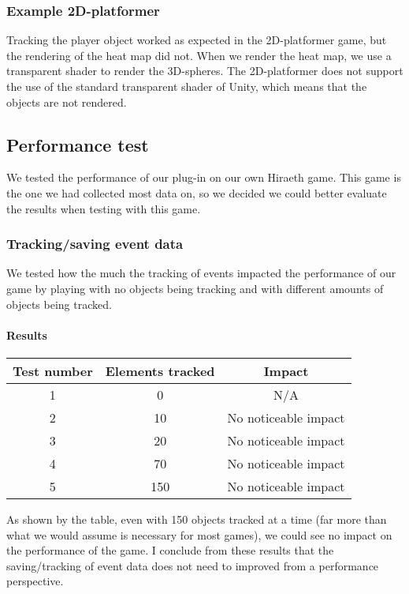 
\subsubsection{Example 2D-platformer}
\label{Test_TG_2D}
Tracking the player object worked as expected in the 2D-platformer game, but the rendering of the heat map did not. When we render the heat map, we use a transparent shader to render the 3D-spheres. The 2D-platformer does not support the use of the standard transparent shader of Unity, which means that the objects are not rendered.

\subsection{Performance test}
\label{Test_P}
We tested the performance of our plug-in on our own Hiraeth game. This game is the one we had collected most data on, so we decided we could better evaluate the results when testing with this game.

\subsubsection{Tracking/saving event data}
\label{Test_P_Saving}
We tested how the much the tracking of events impacted the performance of our game by playing with no objects being tracking and with different amounts of objects being tracked.

\paragraph{Results}
\begin{center}
\begin{tabular}{| c | c | c |}
\hline
Test number & Elements tracked & Impact \\ 
\hline
1 & 0 & N/A \\ 
\hline
2 & 10 & No noticeable impact \\ 
\hline
3 & 20 & No noticeable impact \\ 
\hline
4 & 70 & No noticeable impact \\ 
\hline
5 & 150 & No noticeable impact \\
\hline
\end{tabular}
\end{center}

As shown by the table, even with 150 objects tracked at a time (far more than what we would assume is necessary for most games), we could see no impact on the performance of the game. I conclude from these results that the saving/tracking of event data does not need to improved from a performance perspective.

